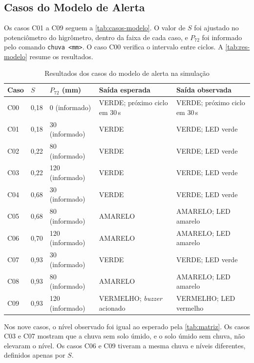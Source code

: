 \subsection{Casos do Modelo de Alerta}
\label{subsec:res-modelo}

Os casos C01 a C09 seguem a \autoref{tab:casos-modelo}. O valor de $S$
foi ajustado no potenciômetro do higrômetro, dentro da faixa de cada
caso, e $P_{72}$ foi informado pelo comando \texttt{chuva <mm>}. O caso
C00 verifica o intervalo entre ciclos. A \autoref{tab:res-modelo}
resume os resultados.

\begin{table}[H]
\centering
\caption{Resultados dos casos do modelo de alerta na simulação}
\label{tab:res-modelo}
\small
\begin{tabular}{p{0.9cm}p{1.2cm}p{2.4cm}p{4.2cm}p{4.6cm}}
\hline
\textbf{Caso} & \textbf{$S$} & \textbf{$P_{72}$ (mm)} & \textbf{Saída esperada} & \textbf{Saída observada} \\
\hline
C00 & 0,18 & 0 (informado) & VERDE; próximo ciclo em 30\,s & VERDE; próximo ciclo em 30\,s \\
C01 & 0,18 & 30 (informado) & VERDE & VERDE; LED verde \\
C02 & 0,22 & 80 (informado) & VERDE & VERDE; LED verde \\
C03 & 0,22 & 120 (informado) & VERDE & VERDE; LED verde \\
C04 & 0,68 & 30 (informado) & VERDE & VERDE; LED verde \\
C05 & 0,68 & 80 (informado) & AMARELO & AMARELO; LED amarelo \\
C06 & 0,70 & 120 (informado) & AMARELO & AMARELO; LED amarelo \\
C07 & 0,93 & 30 (informado) & VERDE & VERDE; LED verde \\
C08 & 0,93 & 80 (informado) & AMARELO & AMARELO; LED amarelo \\
C09 & 0,93 & 120 (informado) & VERMELHO; \textit{buzzer} acionado & VERMELHO; LED vermelho \\
\hline
\end{tabular}
\end{table}

Nos nove casos, o nível observado foi igual ao esperado pela
\autoref{tab:matriz}. Os casos C03 e C07 mostram que a chuva sem solo
úmido, e o solo úmido sem chuva, não elevaram o nível. Os casos C06 e
C09 tiveram a mesma chuva e níveis diferentes, definidos apenas por $S$.

